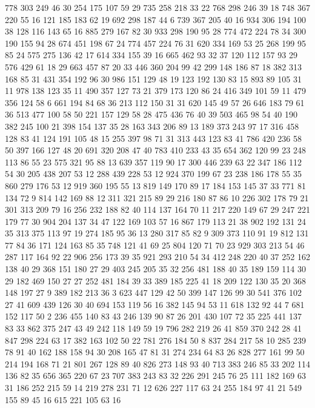 \begin{pyverbatim}
{	778	303	249	46	30	254	175	107	59	29	735	258	218	33	22	768	298	246	39	18
	748	367	220	55	16	121	185	183	62	19	692	298	187	44	6	739	367	205	40	16
	934	306	194	100	38	128	116	143	65	16	885	279	167	82	30	933	298	190	95	28
	774	472	224	78	34	300	190	155	94	28	674	451	198	67	24	774	457	224	76	31
	620	334	169	53	25	268	199	95	85	24	575	275	136	42	17	614	334	155	39	16
	665	462	93	32	37	120	112	157	93	29	576	429	61	18	29	663	457	87	20	33
	446	360	204	99	42	299	148	186	87	18	382	313	168	85	31	431	354	192	96	30
	986	151	129	48	19	123	192	130	83	15	893	89	105	31	11	978	138	123	35	11
	490	357	127	73	21	379	173	120	86	24	416	349	101	59	11	479	356	124	58	6
	661	194	84	68	36	213	112	150	31	31	620	145	49	57	26	646	183	79	61	36
	513	477	100	58	50	221	157	129	58	28	475	436	76	40	39	503	465	98	54	40
	190	382	245	100	21	398	154	137	35	28	163	343	206	89	13	189	373	243	97	17
	316	458	128	83	41	124	191	105	48	15	255	397	98	71	31	313	443	123	83	41
	786	420	236	58	50	397	166	127	48	20	691	320	208	47	40	783	410	233	43	35
	654	362	120	99	23	248	113	86	55	23	575	321	95	88	13	639	357	119	90	17
	300	446	239	63	22	347	186	112	54	30	205	438	207	53	12	288	439	228	53	12
	924	370	199	67	23	238	186	178	55	35	860	279	176	53	12	919	360	195	55	13
	819	149	170	89	17	184	153	145	37	33	771	81	134	72	9	814	142	169	88	12
	311	321	215	89	29	216	180	87	86	10	226	302	178	79	21	301	313	209	79	16
	256	232	188	82	40	114	137	164	70	11	217	220	149	67	29	247	221	179	77	30
	904	204	137	34	47	122	169	103	57	16	867	179	113	21	38	902	192	131	24	35
	313	375	113	97	19	274	185	95	36	13	280	317	85	82	9	309	373	110	91	19
	812	131	77	84	36	171	124	163	85	35	748	121	41	69	25	804	120	71	70	23
	929	303	213	54	46	287	117	164	92	22	906	256	173	39	35	921	293	210	54	34
	412	248	220	40	37	252	162	138	40	29	368	151	180	27	29	403	245	205	35	32
	256	481	188	40	35	189	159	114	30	29	182	469	150	27	27	252	481	184	39	33
	389	185	225	41	18	209	122	130	35	20	368	148	197	27	9	389	182	213	36	3
	623	447	129	42	50	399	147	126	99	30	541	376	102	27	41	609	439	126	30	40
	694	153	119	56	16	382	145	94	53	11	618	132	92	44	7	681	152	117	50	2
	236	455	140	83	43	246	139	90	87	26	201	430	107	72	35	225	441	137	83	33
	862	375	247	43	49	242	118	149	59	19	796	282	219	26	41	859	370	242	28	41
	847	298	224	63	17	382	163	102	50	22	781	276	184	50	8	837	284	217	58	10
	285	239	78	91	40	162	188	158	94	30	208	165	47	81	31	274	234	64	83	26
	828	277	161	99	50	214	194	168	71	21	801	267	128	89	40	826	273	148	93	40
	713	383	246	85	33	202	114	136	82	35	656	365	220	67	23	707	383	243	83	32
	226	291	245	76	25	111	182	169	63	31	186	252	215	59	14	219	278	231	71	12
	626	227	117	63	24	255	184	97	41	21	549	155	89	45	16	615	221	105	63	16
}
\end{pyverbatim}
